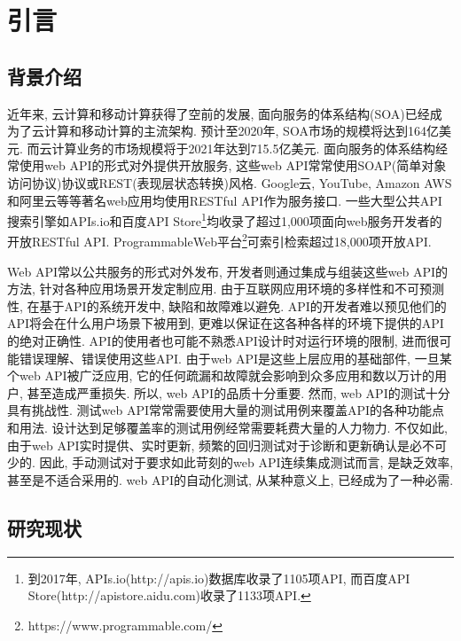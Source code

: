 \chapter{引言}

	\section{背景介绍}
    
        近年来, 云计算和移动计算获得了空前的发展, 面向服务的体系结构(SOA)已经成为了云计算和移动计算的主流架构\cite{wintergreen17}. 预计至2020年, SOA市场的规模将达到164亿美元. 而云计算业务的市场规模将于2021年达到715.5亿美元\cite{skyhighnetworks18azure}. 面向服务的体系结构经常使用web API的形式对外提供开放服务\cite{hamza15}, 这些web API常常使用SOAP(简单对象访问协议)协议或REST(表现层状态转换)风格\cite{fielding2000architectural}. Google云\cite{googlecloud17}, YouTube\cite{youtube17}, Amazon AWS\cite{amazonec217}和阿里云\cite{alibaba17}等等著名web应用均使用RESTful API作为服务接口. 一些大型公共API搜索引擎如APIs.io和百度API Store\footnote{到2017年, APIs.io(http://apis.io)数据库收录了1105项API, 而百度API Store(http://apistore.aidu.com)收录了1133项API.}均收录了超过1,000项面向web服务开发者的开放RESTful API. ProgrammableWeb平台\footnote{https://www.programmable.com/}可索引检索超过18,000项开放API.
        
        Web API常以公共服务的形式对外发布, 开发者则通过集成与组装这些web API的方法, 针对各种应用场景开发定制应用. 由于互联网应用环境的多样性和不可预测性, 在基于API的系统开发中, 缺陷和故障难以避免. API的开发者难以预见他们的API将会在什么用户场景下被用到, 更难以保证在这各种各样的环境下提供的API的绝对正确性. API的使用者也可能不熟悉API设计时对运行环境的限制, 进而很可能错误理解、错误使用这些API. 由于web API是这些上层应用的基础部件, 一旦某个web API被广泛应用, 它的任何疏漏和故障就会影响到众多应用和数以万计的用户, 甚至造成严重损失. 所以, web API的品质十分重要. 然而, web API的测试十分具有挑战性. 测试web API常常需要使用大量的测试用例来覆盖API的各种功能点和用法. 设计达到足够覆盖率的测试用例经常需要耗费大量的人力物力. 不仅如此, 由于web API实时提供、实时更新, 频繁的回归测试对于诊断和更新确认是必不可少的. 因此, 手动测试对于要求如此苛刻的web API连续集成测试而言, 是缺乏效率, 甚至是不适合采用的. web API的自动化测试, 从某种意义上, 已经成为了一种必需.

	\section{研究现状}
	
	    \label{sec:research_status}
	
